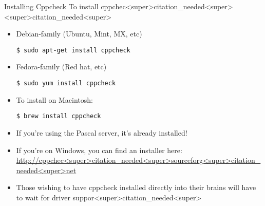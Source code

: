 \documentclass[11pt]{beamer}
\begin{document}
\begin{frame}[fragile=singleslide]{Installing Cppcheck}
To install cppchec<super>citation_needed<super><super>citation_needed<super>
\begin{itemize}
\item Debian-family (Ubuntu, Mint, MX, etc)
\begin{lstlisting}[style=terminal]
$ sudo apt-get install cppcheck
\end{lstlisting}
\item Fedora-family (Red hat, etc)
\begin{lstlisting}[style=terminal]
$ sudo yum install cppcheck
\end{lstlisting}
\item To install on Macintosh:
\begin{lstlisting}[style=terminal]
$ brew install cppcheck
\end{lstlisting}
\item If you're using the Pascal server, it's already installed!
\item If you're on Windows, you can find an installer here: \url{http://cppchec<super>citation_needed<super>sourceforg<super>citation_needed<super>net} \\ 
\item Those wishing to have cppcheck installed directly into their brains will have to wait for driver suppor<super>citation_needed<super>  
\end{itemize}
\end{frame}
\end{document}
